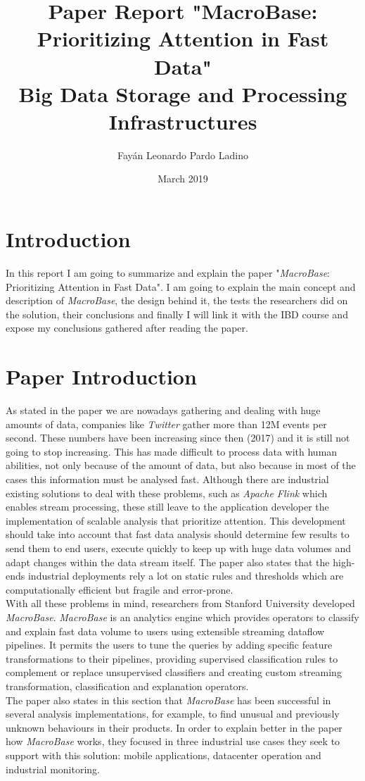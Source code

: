 \documentclass[11pt, titlepage]{article}
\title{Paper Report "MacroBase: Prioritizing Attention in Fast Data" \\ Big Data Storage and Processing Infrastructures}
\author{Fayán Leonardo Pardo Ladino}
\date{March 2019}
\begin{document}
	\maketitle
	\section{Introduction}
	\begin{flushleft}
		In this report I am going to summarize and explain the paper "\textit{MacroBase}: Prioritizing Attention in Fast Data". I am going to explain the main concept and description of \textit{MacroBase}, the design behind it, the tests the researchers did on the solution, their conclusions and finally I will link it with the IBD course and expose my conclusions gathered after reading the paper.
	\end{flushleft}
	\section{Paper Introduction}
	\begin{flushleft}
		As stated in the paper we are nowadays gathering and dealing with huge amounts of data, companies like \textit{Twitter} gather more than 12M events per second. These numbers have been increasing since then (2017) and it is still not going to stop increasing. This has made difficult to process data with human abilities, not only because of the amount of data, but also because in most of the cases this information must be analysed fast. Although there are industrial existing solutions to deal with these problems, such as \textit{Apache Flink} which enables stream processing, these still leave to the application developer the implementation of scalable analysis that prioritize attention. This development should take into account that fast data analysis should determine few results to send them to end users, execute quickly to keep up with huge data volumes and adapt changes within the data stream itself. The paper also states that the high-ends industrial deployments rely a lot on static rules and thresholds which are computationally efficient but fragile and error-prone.
		\\With all these problems in mind, researchers from Stanford University developed \textit{MacroBase}. \textit{MacroBase} is an analytics engine which provides operators to classify and explain fast data volume to users using extensible streaming dataflow pipelines. It permits the users to tune the queries by adding specific feature transformations to their pipelines, providing supervised classification rules to complement or replace unsupervised classifiers and creating custom streaming transformation, classification and explanation operators.
		\\The paper also states in this section that \textit{MacroBase} has been successful in several analysis implementations, for example, to find unusual and previously unknown behaviours in their products. In order to explain better in the paper how \textit{MacroBase} works, they focused in three industrial use cases they seek to support with this solution: mobile applications, datacenter operation and industrial monitoring.
	\end{flushleft}
\end{document}
